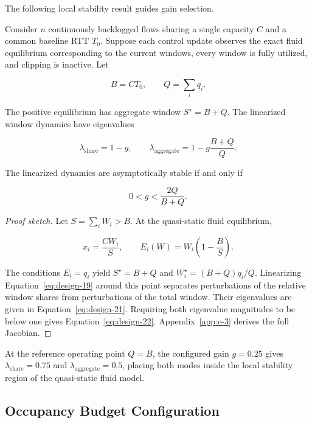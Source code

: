 The following local stability result guides gain selection.

\begin{proposition}
\label{prop:main-2}
Consider \(n\) continuously backlogged flows sharing a single capacity \(C\) and a common baseline RTT \(T_0\). Suppose each control update observes the exact fluid equilibrium corresponding to the current windows, every window is fully utilized, and clipping is inactive. Let

\[
B=CT_0,\qquad Q=\sum_iq_i.
\]

The positive equilibrium has aggregate window \(S^\star=B+Q\). The linearized window dynamics have eigenvalues

\begin{equation}
\label{eq:design-21}
\lambda_{\mathrm{share}}=1-g,
\qquad
\lambda_{\mathrm{aggregate}}
=1-g\frac{B+Q}{Q}.
\end{equation}

The linearized dynamics are asymptotically stable if and only if

\begin{equation}
\label{eq:design-22}
\boxed{
0<g<\frac{2Q}{B+Q}.
}
\end{equation}
\end{proposition}

\begin{proof}[Proof sketch] Let \(S=\sum_iW_i>B\). At the quasi-static fluid equilibrium,

\[
x_i=\frac{CW_i}{S},
\qquad
E_i(W)=W_i\left(1-\frac{B}{S}\right).
\]

The conditions \(E_i=q_i\) yield \(S^\star=B+Q\) and \(W_i^\star=(B+Q)q_i/Q\). Linearizing Equation~\eqref{eq:design-19} around this point separates perturbations of the relative window shares from perturbations of the total window. Their eigenvalues are given in Equation~\eqref{eq:design-21}. Requiring both eigenvalue magnitudes to be below one gives Equation~\eqref{eq:design-22}. Appendix~\ref{app:e-3} derives the full Jacobian.
\end{proof}

At the reference operating point \(Q=B\), the configured gain \(g=0.25\) gives \(\lambda_{\mathrm{share}}=0.75\) and \(\lambda_{\mathrm{aggregate}}=0.5\), placing both modes inside the local stability region of the quasi-static fluid model.

\subsection{Occupancy Budget Configuration}
\label{sec:budget}

